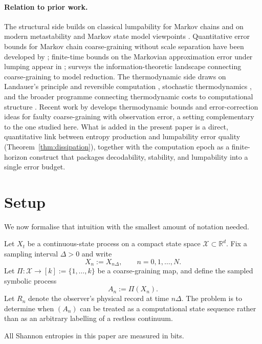 \documentclass[11pt,a4paper]{article}
\theoremstyle{definition}
\theoremstyle{remark}
\newcommand{\Xc}{\mathcal{X}}
\newcommand{\R}{\mathbb{R}}
\begin{document}
\paragraph{Relation to prior work.}
The structural side builds on classical lumpability for Markov chains \citep{kemeny1960,buchholz1994} and on modern metastability and Markov state model viewpoints \citep{deuflhard2005,schuette2013,husic2018}. Quantitative error bounds for Markov chain coarse-graining without scale separation have been developed by \citet{hilder2024}; finite-time bounds on the Markovian approximation error under lumping appear in \citet{andrieux2012}; \citet{geiger2025} surveys the information-theoretic landscape connecting coarse-graining to model reduction. The thermodynamic side draws on Landauer's principle and reversible computation \citep{landauer1961,bennett1982}, stochastic thermodynamics \citep{schnakenberg1976,seifert2012,wolpert2019}, and the broader programme connecting thermodynamic costs to computational structure \citep{wolpert2024arxiv}. Recent work by \citet{vandermeer2025} develops thermodynamic bounds and error-correction ideas for faulty coarse-graining with observation error, a setting complementary to the one studied here. What is added in the present paper is a direct, quantitative link between entropy production and lumpability error quality (Theorem~\ref{thm:dissipation}), together with the computation epoch as a finite-horizon construct that packages decodability, stability, and lumpability into a single error budget.

\section{Setup}\label{sec:setup}

We now formalise that intuition with the smallest amount of notation needed.

Let $X_t$ be a continuous-state process on a compact state space $\Xc \subset \R^d$. Fix a sampling interval $\Delta>0$ and write
\[
X_n := X_{n\Delta}, \qquad n=0,1,\ldots,N.
\]
Let $\Pi:\Xc \to [k] := \{1,\ldots,k\}$ be a coarse-graining map, and define the sampled symbolic process
\[
A_n := \Pi(X_n).
\]
Let $R_n$ denote the observer's physical record at time $n\Delta$. The problem is to determine when $(A_n)$ can be treated as a computational state sequence rather than as an arbitrary labelling of a restless continuum.

All Shannon entropies in this paper are measured in bits.
\end{document}
